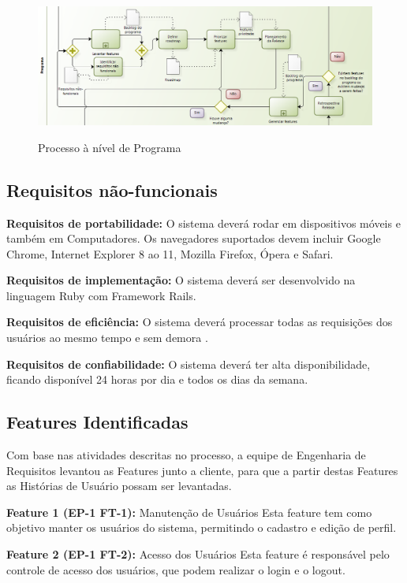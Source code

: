 \FloatBarrier
\begin{figure}[!htpd]
		\centering
		\includegraphics[scale=0.4]{figuras/programa}
		\label{img:programa}
		\caption{Processo à nível de Programa}
\end{figure}
\FloatBarrier

\subsection{Requisitos não-funcionais}

\textbf{Requisitos de portabilidade:} O sistema deverá rodar em dispositivos móveis e também em Computadores. Os navegadores suportados devem incluir Google Chrome, Internet Explorer 8 ao 11, Mozilla Firefox, Ópera e Safari.

\textbf{Requisitos de implementação:} O sistema deverá ser desenvolvido na linguagem Ruby com Framework Rails.

\textbf{Requisitos de eficiência:} O sistema deverá processar todas as requisições dos usuários ao mesmo tempo e sem demora .

\textbf{Requisitos de confiabilidade:} O sistema deverá ter alta disponibilidade, ficando disponível 24 horas por dia e todos os dias da semana.

\subsection{Features Identificadas}
Com base nas atividades descritas no processo, a equipe de Engenharia de Requisitos levantou as Features junto a cliente, para que a partir destas Features as Histórias de Usuário possam ser levantadas.

\textbf{Feature 1 (EP-1 FT-1):} Manutenção de Usuários
Esta feature tem como objetivo manter os usuários do sistema, permitindo o cadastro e edição de perfil.

\textbf{Feature 2 (EP-1 FT-2):} Acesso dos Usuários
Esta feature é responsável pelo controle de acesso dos usuários, que podem realizar o login e o logout.

